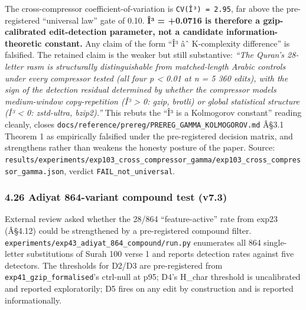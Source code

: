 \documentclass[
]{article}
\begin{document}
The cross-compressor coefficient-of-variation is
\texttt{CV(Î³)\ =\ 2.95}, far above the pre-registered ``universal law''
gate of 0.10. \textbf{Î³ = +0.0716 is therefore a gzip-calibrated
edit-detection parameter, not a candidate information-theoretic
constant.} Any claim of the form ``Î³ âˆ K-complexity difference'' is
falsified. The retained claim is the weaker but still substantive:
\emph{``The Quran's 28-letter rasm is structurally distinguishable from
matched-length Arabic controls under every compressor tested (all four p
\textless{} 0.01 at n = 5 360 edits), with the sign of the detection
residual determined by whether the compressor models medium-window
copy-repetition (Î³ \textgreater{} 0: gzip, brotli) or global
statistical structure (Î³ \textless{} 0: zstd-ultra, bzip2).''} This
rebuts the ``Î³ is a Kolmogorov constant'' reading cleanly, closes
\texttt{docs/reference/prereg/PREREG\_GAMMA\_KOLMOGOROV.md} Â§3.1
Theorem 1 as empirically falsified under the pre-registered decision
matrix, and strengthens rather than weakens the honesty posture of the
paper. Source:
\texttt{results/experiments/exp103\_cross\_compressor\_gamma/exp103\_cross\_compressor\_gamma.json},
verdict \texttt{FAIL\_not\_universal}.

\subsubsection{4.26 Adiyat 864-variant compound test
(v7.3)}\label{adiyat-864-variant-compound-test-v7.3}

External review asked whether the 28/864 ``feature-active'' rate from
exp23 (Â§4.12) could be strengthened by a pre-registered compound
filter. \texttt{experiments/exp43\_adiyat\_864\_compound/run.py}
enumerates all 864 single-letter substitutions of Surah 100 verse 1 and
reports detection rates against five detectors. The thresholds for D2/D3
are pre-registered from \texttt{exp41\_gzip\_formalised}'s ctrl-null at
p95; D4's H\_char threshold is uncalibrated and reported exploratorily;
D5 fires on any edit by construction and is reported informationally.
\end{document}
